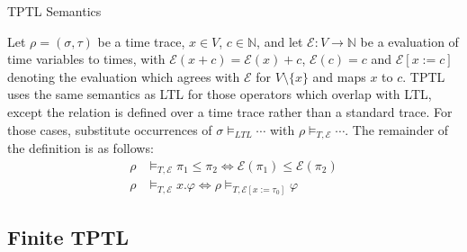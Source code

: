 \documentclass[a4paper]{article}
\newcommand{\eval}{\mathcal{E}}
\begin{document}
\begin{defn}{TPTL Semantics}

  Let $\rho = (\sigma,\tau)$ be a time trace, $x\in V$, $c\in\mathbb{N}$, and let $\eval:V\to\mathbb{N}$ be a evaluation of time variables to times, with $\eval(x + c) = \eval(x) + c$, $\eval(c) = c$ and $\eval[x:=c]$ denoting the evaluation which agrees with $\eval$ for $V\setminus\{x\}$ and maps $x$ to $c$.
  TPTL uses the same semantics as LTL for those operators which overlap with LTL, except the relation is defined over a time trace rather than a standard trace. For those cases, substitute occurrences of $\sigma\vDash_{LTL}\cdots$ with $\rho\vDash_{T,\eval}\cdots$. The remainder of the definition is as follows:
  \begin{align*}
    \rho&\vDash_{T,\eval}\pi_1\leq\pi_2 \iff \eval(\pi_1)\leq\eval(\pi_2)\\
    \rho&\vDash_{T,\eval} x.\varphi \iff \rho\vDash_{T,\eval[x:=\tau_0]}\varphi
  \end{align*}
\end{defn}

\subsection{Finite TPTL}
\end{document}
